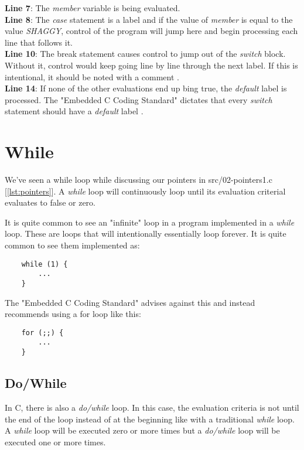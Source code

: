 \documentclass[../main.tex]{subfiles}
\begin{document}
	

	\textbf{Line 7}: The \textit{member} variable is being evaluated. \\
	\textbf{Line 8}: The \textit{case} statement is a label and if the value of \textit{member} is equal to the value \textit{SHAGGY}, control of the program will jump here and begin processing each line that follows it. \\
	\textbf{Line 10}: The break statement causes control to jump out of the \textit{switch} block.  Without it, control would keep going line by line through the next label.  If this is intentional, it should be noted with a comment \cite{embedded_c}.\\
	\textbf{Line 14}: If none of the other evaluations end up bing true, the \textit{default} label is processed.  The "Embedded C Coding Standard" dictates that every \textit{switch} statement should have a \textit{default} label \cite{embedded_c}.\\
	
	\section{While}
	We've seen a while loop while discussing our pointers in src/02-pointers1.c [\ref{lst:pointers}].  A \textit{while} loop will continuously loop until its evaluation criterial evaluates to false or zero.
	
	It is quite common to see an "infinite" loop in a program implemented in a \textit{while} loop.  These are loops that will intentionally essentially loop forever.  It is quite common to see them implemented as:
	
	\begin{verbatim}
	while (1) {
		...
	}
	\end{verbatim}
	
	The "Embedded C Coding Standard" \cite{embedded_c} advises against this and instead recommends using a for loop like this:
	
	\begin{verbatim}
	for (;;) {
		...
	}
	\end{verbatim}
	
	\subsection{Do/While}
	In C, there is also a \textit{do/while} loop.  In this case, the evaluation criteria is not until the end of the loop instead of at the beginning like with a traditional \textit{while} loop.  A \textit{while} loop will be executed zero or more times but a \textit{do/while} loop will be executed one or more times.
	
\end{document}
